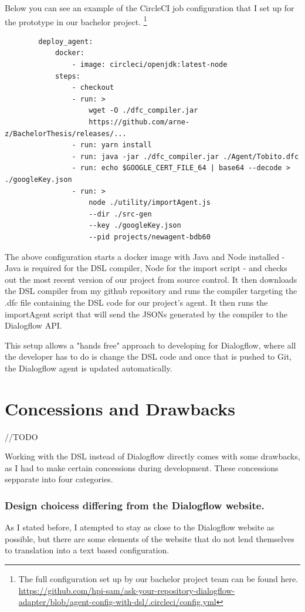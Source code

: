 Below you can see an example of the CircleCI job configuration that I set up for the prototype in our bachelor project.
\footnote{The full configuration set up by our bachelor project team can be found here.\\
\url{https://github.com/hpi-sam/ask-your-repository-dialogflow-adapter/blob/agent-config-with-dsl/.circleci/config.yml}}
\begin{samepage}    
    \begin{verbatim}
        deploy_agent:
            docker:
                - image: circleci/openjdk:latest-node
            steps:
                - checkout
                - run: > 
                    wget -O ./dfc_compiler.jar
                    https://github.com/arne-z/BachelorThesis/releases/...
                - run: yarn install
                - run: java -jar ./dfc_compiler.jar ./Agent/Tobito.dfc
                - run: echo $GOOGLE_CERT_FILE_64 | base64 --decode > ./googleKey.json
                - run: >
                    node ./utility/importAgent.js 
                    --dir ./src-gen 
                    --key ./googleKey.json 
                    --pid projects/newagent-bdb60
    \end{verbatim}
\end{samepage}

The above configuration starts a docker image with Java and Node installed - Java is required for the DSL compiler, Node for the import script - and checks out the most recent version of our project from source control.
It then downloads the DSL compiler from my github repository and runs the compiler targeting the .dfc file containing the DSL code for our project's agent.
It then runs the importAgent script that will send the JSONs generated by the compiler to the Dialogflow API.

This setup allows a "hands free" approach to developing for Dialogflow, where all the developer has to do is change the DSL code and once that is pushed to Git, the Dialogflow agent is updated automatically.


\section{Concessions and Drawbacks}
//TODO 

Working with the DSL instead of Dialogflow directly comes with some drawbacks, as I had to make certain concessions during development. 
These concessions sepparate into four categories.

\subsubsection{Design choicess differing from the Dialogflow website.}
As I stated before, I atempted to stay as close to the Dialogflow website as possible, but there are some elements of the website that do not lend themselves to translation into a text based configuration.

